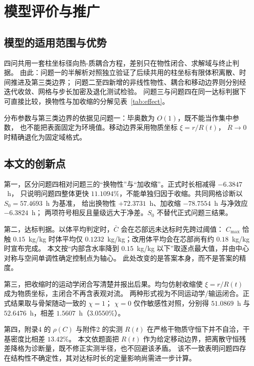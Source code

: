 \section{模型评价与推广}

\subsection{模型的适用范围与优势}

四问共用一套柱坐标径向热-质耦合方程，差别只在物性闭合、求解域与终止判据。
由此：问题一的半解析对照独立验证了后续共用的柱坐标有限体积离散、时间推进及第三类边界；
问题二至四新增的非线性物性、耦合和移动边界则分别经迭代收敛、网格与步长加密及退化测试检验。
问题三与问题四在同一达标判据下可直接比较，换物性与加收缩的分解见表~\ref{tab:effect}。

分布参数与第三类边界的依据见问题一：毕奥数为 $O(1)$，既不能当作集中参数，
也不能把表面固定为环境值。移动边界采用物质坐标 $\xi=r/R(t)$，
$\dot R\to 0$ 时精确退化为固定域格式。

\subsection{本文的创新点}

第一，区分问题四相对问题三的“换物性”与“加收缩”。正式时长相减得 $-6.3847$~h，
只说明问题四整体更快 $11.1094\%$，不能单独归因于收缩。共同网格诊断以 $S_0=57.4693$~h 为基准，
给出换物性 $+72.3731$~h、加收缩 $-78.7554$~h 与净效应 $-6.3824$~h；
两项符号相反且量级远大于净差。$S_0$ 不替代正式问题三结果。

第二，达标判据。以体平均判定时，$\bar C$ 会在芯部远未达标时先跨过阈值：
$C_{\max}$ 恰触 $0.15$~kg/kg 时体平均仅 $0.1232$~kg/kg；改用体平均会在芯部尚有约 $0.18$~kg/kg 时宣布完成。
本文按“内部含水率降到 $0.15$~kg/kg 以下”取逐点最大值，并由中心对称与空间单调性确定控制点为轴心。
此处改变的是答案本身，而不是答案的精度。

第三，把收缩时的运动学闭合写清楚并报出后果。均匀仿射收缩使 $\xi=r/R(t)$ 成为物质坐标，主闭合不再含表观对流。
两种形式视为不同运动学/输运闭合。正式结果取与骨架随动一致的 $\chi=1$；
$\chi=0$ 仅作敏感性对照，分别得 $51.0869$~h 与 $52.6476$~h，相差 $1.5607$~h（$3.0550\%$）。

第四，附录4 的 $\rho(C)$ 与附件2 的实测 $R(t)$ 在严格干物质守恒下并不自洽，干基密度比相差 $13.42\%$。
本文依题面把 $R(t)$ 作为给定移动边界，把离散守恒残差降格为诊断量，既不修正实测半径，也不回避该矛盾。
该不一致表明问题四存在结构性不确定性，其对达标时长的定量影响尚需进一步计算。

